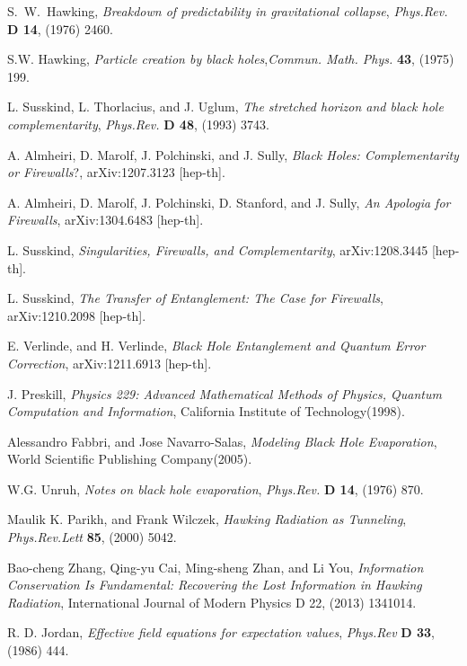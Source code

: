 \documentclass[12pt,a4paper]{article}
\begin{document}
\begin{thebibliography}{99}
S.~W.~Hawking, \emph{Breakdown of predictability in gravitational
collapse}, \emph{Phys.Rev.} {\bf D 14}, (1976) 2460.


S.W. Hawking, \emph{Particle creation by black holes},\emph{Commun.
Math. Phys.} {\bf 43}, (1975) 199.

L. Susskind, L. Thorlacius, and J. Uglum, \emph{The stretched
horizon and black hole complementarity}, \emph{Phys.Rev.} {\bf D
48}, (1993) 3743.

A. Almheiri, D. Marolf, J. Polchinski, and J. Sully, \emph{Black
Holes: Complementarity or Firewalls}?, arXiv:1207.3123 [hep-th].

A. Almheiri, D. Marolf, J. Polchinski, D. Stanford, and J. Sully,
\emph{An Apologia for Firewalls}, arXiv:1304.6483 [hep-th].

L. Susskind, \emph{Singularities, Firewalls, and Complementarity},
arXiv:1208.3445 [hep-th].

L. Susskind, \emph{The Transfer of Entanglement: The Case for
Firewalls}, arXiv:1210.2098 [hep-th].

E. Verlinde, and H. Verlinde, \emph{Black Hole Entanglement and
Quantum Error Correction}, arXiv:1211.6913 [hep-th].

J. Preskill, \emph{Physics 229: Advanced Mathematical Methods of
Physics, Quantum Computation and Information}, California Institute
of Technology(1998).

Alessandro Fabbri, and Jose Navarro-Salas, \emph{Modeling Black
Hole Evaporation}, World Scientific Publishing Company(2005).

W.G. Unruh, \emph{Notes on black hole evaporation}, \emph{Phys.Rev.} {\bf D
14}, (1976) 870.

Maulik K. Parikh, and Frank Wilczek, \emph{Hawking Radiation as
Tunneling},  \emph{Phys.Rev.Lett} {\bf 85}, (2000) 5042.

Bao-cheng Zhang, Qing-yu Cai, Ming-sheng Zhan, and Li You, \emph{Information Conservation Is Fundamental: Recovering the Lost Information in Hawking Radiation}, International Journal of Modern Physics D 22, (2013) 1341014.

R. D. Jordan, \emph{Effective field equations for expectation
values}, \emph{Phys.Rev} {\bf D 33}, (1986) 444.


\end{thebibliography}
\end{document}
